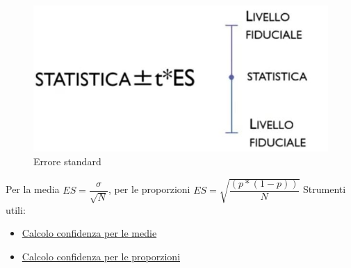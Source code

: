 \documentclass[11pt,a4paper]{book}
\begin{document}
\begin{figure}[h!]
	\begin{center}
		\includegraphics[scale=0.6]{img/025.jpg}
		\caption{Errore standard}
		\label{fig: 025}
	\end{center}
\end{figure}

Per la media $ES=\dfrac{\sigma}{\sqrt{N}}$, per le proporzioni $ES=\sqrt{\dfrac{(p*(1-p))}{N}}$
Strumenti utili:
\begin{itemize}
	\item \href{http://vassarstats.net/conf_mean.html}{Calcolo confidenza per le medie}
	\item \href{http://vassarstats.net/prop1.html}{Calcolo confidenza per le proporzioni}
\end{itemize}
\end{document}

